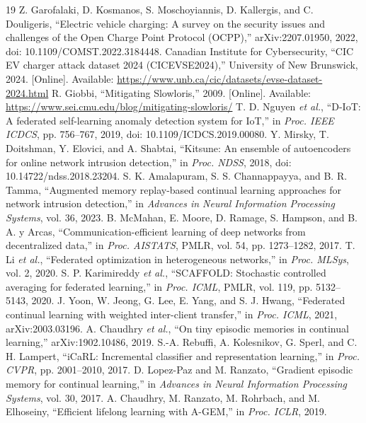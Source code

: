 \documentclass[journal,10pt]{IEEEtran}
\begin{document}
\begin{thebibliography}{19}
 Z. Garofalaki, D. Kosmanos, S. Moschoyiannis, D. Kallergis, and C. Douligeris, ``Electric vehicle charging: A survey on the security issues and challenges of the Open Charge Point Protocol (OCPP),'' arXiv:2207.01950, 2022, doi: 10.1109/COMST.2022.3184448.
 Canadian Institute for Cybersecurity, ``CIC EV charger attack dataset 2024 (CICEVSE2024),'' University of New Brunswick, 2024. [Online]. Available: \url{https://www.unb.ca/cic/datasets/evse-dataset-2024.html}
 R. Giobbi, ``Mitigating Slowloris,'' 2009. [Online]. Available: \url{https://www.sei.cmu.edu/blog/mitigating-slowloris/}
 T. D. Nguyen \emph{et al.}, ``D-IoT: A federated self-learning anomaly detection system for IoT,'' in \emph{Proc. IEEE ICDCS}, pp. 756--767, 2019, doi: 10.1109/ICDCS.2019.00080.
 Y. Mirsky, T. Doitshman, Y. Elovici, and A. Shabtai, ``Kitsune: An ensemble of autoencoders for online network intrusion detection,'' in \emph{Proc. NDSS}, 2018, doi: 10.14722/ndss.2018.23204.
 S. K. Amalapuram, S. S. Channappayya, and B. R. Tamma, ``Augmented memory replay-based continual learning approaches for network intrusion detection,'' in \emph{Advances in Neural Information Processing Systems}, vol. 36, 2023.
 B. McMahan, E. Moore, D. Ramage, S. Hampson, and B. A. y Arcas, ``Communication-efficient learning of deep networks from decentralized data,'' in \emph{Proc. AISTATS}, PMLR, vol. 54, pp. 1273--1282, 2017.
 T. Li \emph{et al.}, ``Federated optimization in heterogeneous networks,'' in \emph{Proc. MLSys}, vol. 2, 2020.
 S. P. Karimireddy \emph{et al.}, ``SCAFFOLD: Stochastic controlled averaging for federated learning,'' in \emph{Proc. ICML}, PMLR, vol. 119, pp. 5132--5143, 2020.
 J. Yoon, W. Jeong, G. Lee, E. Yang, and S. J. Hwang, ``Federated continual learning with weighted inter-client transfer,'' in \emph{Proc. ICML}, 2021, arXiv:2003.03196.
 A. Chaudhry \emph{et al.}, ``On tiny episodic memories in continual learning,'' arXiv:1902.10486, 2019.
 S.-A. Rebuffi, A. Kolesnikov, G. Sperl, and C. H. Lampert, ``iCaRL: Incremental classifier and representation learning,'' in \emph{Proc. CVPR}, pp. 2001--2010, 2017.
 D. Lopez-Paz and M. Ranzato, ``Gradient episodic memory for continual learning,'' in \emph{Advances in Neural Information Processing Systems}, vol. 30, 2017.
 A. Chaudhry, M. Ranzato, M. Rohrbach, and M. Elhoseiny, ``Efficient lifelong learning with A-GEM,'' in \emph{Proc. ICLR}, 2019.


\end{thebibliography}
\end{document}
